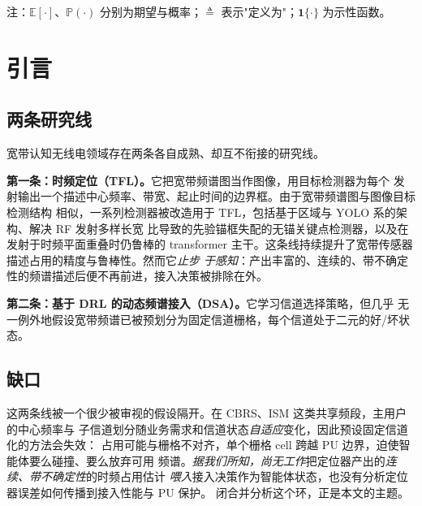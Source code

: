 \documentclass[11pt,a4paper]{article}
\newcommand{\hei}[1]{{\cjkhei #1}}
\theoremstyle{plain}
\theoremstyle{definition}
\newcommand{\E}{\mathbb{E}}
\newcommand{\Prob}{\mathbb{P}}
\newcommand{\defeq}{\triangleq}
\begin{document}
\vspace{4pt}
\noindent\small 注：$\E[\cdot]$、$\Prob(\cdot)$ 分别为期望与概率；$\defeq$ 表示"定义为"；$\mathbf{1}\{\cdot\}$ 为示性函数。\normalsize

\section{引言}

\subsection{两条研究线}
宽带认知无线电领域存在两条各自成熟、却互不衔接的研究线。

\textbf{\hei{第一条：时频定位（TFL）。}}它把宽带频谱图当作图像，用目标检测器为每个
发射输出一个描述中心频率、带宽、起止时间的边界框。由于宽带频谱图与图像目标检测结构
相似，一系列检测器被改造用于 TFL，包括基于区域与 YOLO 系的架构、解决 RF 发射多样长宽
比导致的先验锚框失配的无锚关键点检测器，以及在发射于时频平面重叠时仍鲁棒的
transformer 主干。这条线持续提升了宽带传感器描述占用的精度与鲁棒性。然而它\emph{止步
于感知}：产出丰富的、连续的、带不确定性的频谱描述后便不再前进，接入决策被排除在外。

\textbf{\hei{第二条：基于 DRL 的动态频谱接入（DSA）。}}它学习信道选择策略，但几乎
无一例外地假设宽带频谱已被预划分为固定信道栅格，每个信道处于二元的好/坏状态。

\subsection{缺口}
这两条线被一个很少被审视的假设隔开。在 CBRS、ISM 这类共享频段，主用户的中心频率与
子信道划分随业务需求和信道状态\emph{自适应}变化，因此预设固定信道化的方法会失效：
占用可能与栅格不对齐，单个栅格 cell 跨越 PU 边界，迫使智能体要么碰撞、要么放弃可用
频谱。\emph{据我们所知，尚无工作}把定位器产出的\emph{连续、带不确定性}的时频占用估计
\emph{喂入}接入决策作为智能体状态，也没有分析定位器误差如何传播到接入性能与 PU 保护。
闭合并分析这个环，正是本文的主题。
\end{document}
